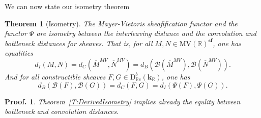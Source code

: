 \documentclass[a4paper, english, 11pt]{article}
\newcommand{\kk}[0]{\textbf{k}}
\newcommand{\0}{\vec{0}}
\newcommand{\R}[0]{\mathbb{R}}
\newcommand{\D}[0]{\text{D}}
\newcommand{\s}{\textbf{sf}}
\newtheorem*{pf}{Proof.} }
\newtheorem{thm}[prop]{Theorem}
\begin{document}
We can now state our isometry theorem
\begin{thm}[Isometry]\label{T:MainIsometry} The Mayer-Vietoris sheafification functor and the functor $\Psi$ are isometry between the interleaving distance and the convolution and bottleneck distances for sheaves. That is, for all $M, N \in \mbox{MV}(\R)^\s$,  one has equalities 
$$d_I(M, N) = d_C (\overline{M}^{MV}, \overline{N}^{MV}) = d_B(\mathcal{B}(\overline{M}^{MV}), \mathcal{B}(\overline{N}^{MV})). $$ 
And for all constructible sheaves $F, G \in \D^b_{\R c}(\kk_\R)$, one has 
$$ d_B(\mathcal{B}(F), \mathcal{B}(G)) = d_C(F,G) =d_I(\Psi(F), \Psi(G)).$$
\end{thm}
\begin{pf}Theorem~\ref{T:DerivedIsometry} implies already the equlity between bottleneck and convolution distances. 


\end{pf}
\end{document}
